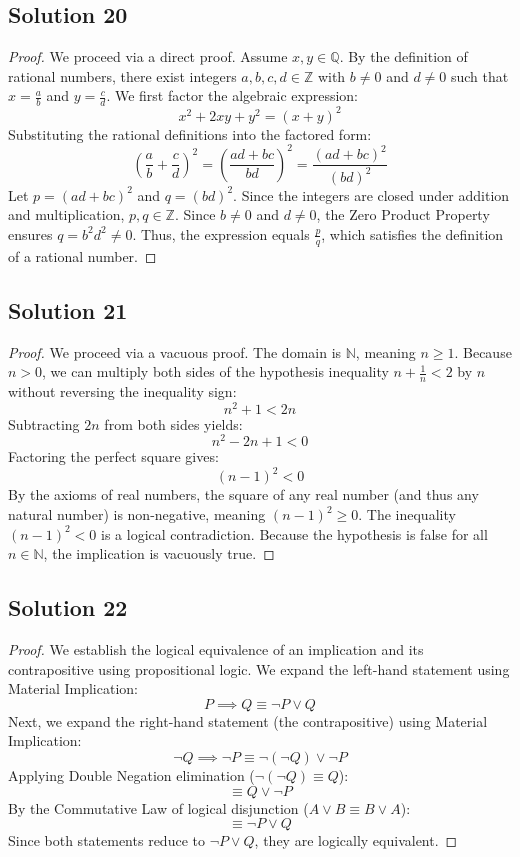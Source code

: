 \documentclass[12pt]{article}
\begin{document}
\subsection*{Solution 20}
\begin{proof}
We proceed via a direct proof. Assume $x, y \in \mathbb{Q}$. By the definition of rational numbers, there exist integers $a, b, c, d \in \mathbb{Z}$ with $b \neq 0$ and $d \neq 0$ such that $x = \frac{a}{b}$ and $y = \frac{c}{d}$. We first factor the algebraic expression:
\[ x^2 + 2xy + y^2 = (x + y)^2 \]
Substituting the rational definitions into the factored form:
\[ \left(\frac{a}{b} + \frac{c}{d}\right)^2 = \left(\frac{ad + bc}{bd}\right)^2 = \frac{(ad + bc)^2}{(bd)^2} \]
Let $p = (ad + bc)^2$ and $q = (bd)^2$. Since the integers are closed under addition and multiplication, $p, q \in \mathbb{Z}$. Since $b \neq 0$ and $d \neq 0$, the Zero Product Property ensures $q = b^2 d^2 \neq 0$. Thus, the expression equals $\frac{p}{q}$, which satisfies the definition of a rational number.
\end{proof}

\subsection*{Solution 21}
\begin{proof}
We proceed via a vacuous proof. The domain is $\mathbb{N}$, meaning $n \ge 1$. Because $n > 0$, we can multiply both sides of the hypothesis inequality $n + \frac{1}{n} < 2$ by $n$ without reversing the inequality sign:
\[ n^2 + 1 < 2n \]
Subtracting $2n$ from both sides yields:
\[ n^2 - 2n + 1 < 0 \]
Factoring the perfect square gives:
\[ (n - 1)^2 < 0 \]
By the axioms of real numbers, the square of any real number (and thus any natural number) is non-negative, meaning $(n - 1)^2 \ge 0$. The inequality $(n - 1)^2 < 0$ is a logical contradiction. Because the hypothesis is false for all $n \in \mathbb{N}$, the implication is vacuously true.
\end{proof}

\subsection*{Solution 22}
\begin{proof}
We establish the logical equivalence of an implication and its contrapositive using propositional logic. We expand the left-hand statement using Material Implication:
\[ P \implies Q \equiv \neg P \lor Q \]
Next, we expand the right-hand statement (the contrapositive) using Material Implication:
\[ \neg Q \implies \neg P \equiv \neg(\neg Q) \lor \neg P \]
Applying Double Negation elimination ($\neg(\neg Q) \equiv Q$):
\[ \equiv Q \lor \neg P \]
By the Commutative Law of logical disjunction ($A \lor B \equiv B \lor A$):
\[ \equiv \neg P \lor Q \]
Since both statements reduce to $\neg P \lor Q$, they are logically equivalent.
\end{proof}
\end{document}
